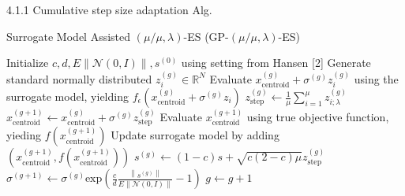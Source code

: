 \documentclass{beamer}
\begin{document}
\begin{frame}{4.1.1 Cumulative step size adaptation Alg.}

\begin{block}{Surrogate Model Assisted $(\mu/\mu,\lambda)$-ES (GP-$(\mu/\mu,\lambda)$-ES)}
 \footnotesize{
    \begin{algorithm}[H]
    \begin{algorithmic}[1]
        \STATE Initialize $c,d,E \left\lVert \mathcal{N}(0,I) \right\rVert,s^{(0)}$  using setting from Hansen [2]
        		\STATE Generate standard normally distributed $z_i^{(g)} \in \mathbb{R}^N $
        		\STATE Evaluate $x_{\text{centroid}}^{(g)} + \sigma^{(g)} z_i^{(g)}$ using the surrogate model, yielding $f_{\epsilon}(x_{\text{centroid}}^{(g)} + \sigma^{(g)} z_i)$
        	\ENDFOR
        	\STATE $z_{\text{step}}^{(g)} \leftarrow \frac{1}{\mu}\sum_{i=1}^{\mu} z_{i;\lambda}^{(g)}$
        	\STATE $x_{\text{centroid}}^{(g+1)} \leftarrow  x_{\text{centroid}}^{(g)} + \sigma^{(g)} z_{\text{step}}^{(g)}$ 
        	\STATE Evaluate $x_{\text{centroid}}^{(g+1)}$ using true objective function, yieding $f(x_{\text{centroid}}^{(g+1)})$
        	\STATE Update surrogate model by adding $(x_{\text{centroid}}^{(g+1)},f(x_{\text{centroid}}^{(g+1)}))$
        	\STATE $s^{(g)} \leftarrow (1-c)s + \sqrt{ c(2-c) \mu} z_{\text{step}}^{(g)}$
        	\STATE $\sigma^{(g+1)} \leftarrow \sigma^{(g)}  \text{exp} \left(\frac{c}{d} \frac{\left\lVert s^{(g)} \right\rVert} { E \left\lVert \mathcal{N}(0,I) \right\rVert} -1 \right )$
        	\STATE $g \leftarrow g + 1$
        \ENDWHILE
    \end{algorithmic}
    \end{algorithm}
}
\end{block}

\end{frame}
\end{document}
